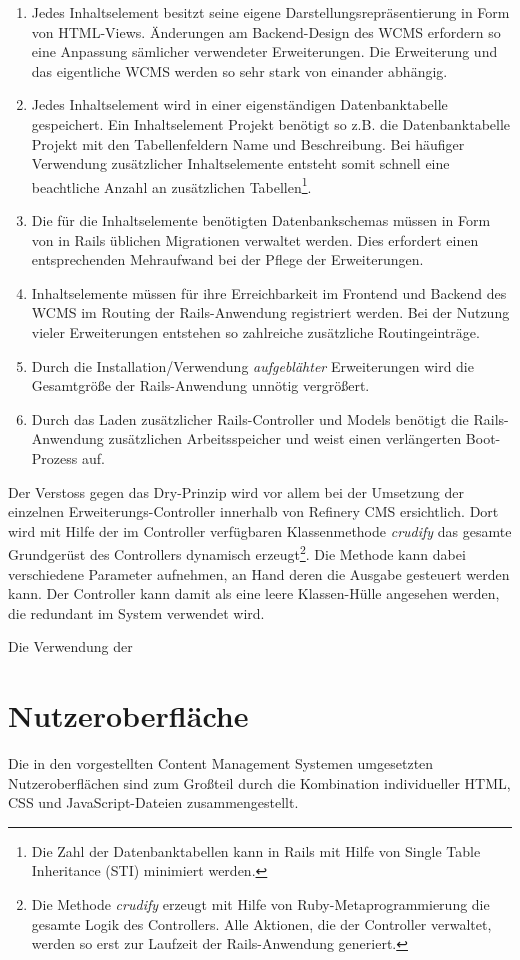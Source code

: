 \begin{enumerate}
\item
Jedes Inhaltselement besitzt seine eigene Darstellungsrepräsentierung in Form von HTML-Views. Änderungen am Backend-Design des WCMS erfordern so eine Anpassung sämlicher verwendeter Erweiterungen. Die Erweiterung und das eigentliche WCMS werden so sehr stark von einander abhängig.
\item
Jedes Inhaltselement wird in einer eigenständigen Datenbanktabelle gespeichert. Ein Inhaltselement Projekt
benötigt so z.B. die Datenbanktabelle Projekt mit den Tabellenfeldern Name und Beschreibung. Bei häufiger Verwendung zusätzlicher Inhaltselemente entsteht somit schnell eine beachtliche Anzahl an zusätzlichen Tabellen\footnote{Die Zahl der Datenbanktabellen kann in Rails mit Hilfe von Single Table Inheritance (STI) minimiert werden.}.
\item
Die für die Inhaltselemente benötigten Datenbankschemas müssen in Form von in Rails üblichen Migrationen verwaltet werden. Dies erfordert einen entsprechenden Mehraufwand bei der Pflege der Erweiterungen.
\item
Inhaltselemente müssen für ihre Erreichbarkeit im Frontend und Backend des WCMS im Routing der Rails-Anwendung registriert werden. Bei der Nutzung vieler Erweiterungen entstehen so zahlreiche zusätzliche Routingeinträge.
\item
Durch die Installation/Verwendung \emph{aufgeblähter} Erweiterungen wird die Gesamtgröße der Rails-Anwendung unnötig vergrößert.
\item
Durch das Laden zusätzlicher Rails-Controller und Models benötigt die Rails-Anwendung zusätzlichen Arbeitsspeicher und weist einen verlängerten Boot-Prozess auf.
\end{enumerate}


Der Verstoss gegen das Dry-Prinzip wird vor allem bei der Umsetzung der einzelnen Erweiterungs-Controller innerhalb von Refinery CMS ersichtlich. Dort wird mit Hilfe der im Controller verfügbaren Klassenmethode \emph{crudify} das gesamte Grundgerüst des Controllers dynamisch erzeugt\footnote{Die Methode \emph{crudify} erzeugt mit Hilfe von Ruby-Metaprogrammierung die gesamte Logik des Controllers. Alle Aktionen, die der Controller verwaltet, werden so erst zur Laufzeit der Rails-Anwendung generiert.}. Die Methode kann dabei verschiedene Parameter aufnehmen, an Hand deren die Ausgabe gesteuert werden kann. Der Controller kann damit als eine leere Klassen-Hülle angesehen werden, die redundant im System verwendet wird.




Die Verwendung der

\section{Nutzeroberfläche}


Die in den vorgestellten Content Management Systemen umgesetzten Nutzeroberflächen sind zum Großteil durch die Kombination individueller HTML, CSS und JavaScript-Dateien zusammengestellt.

